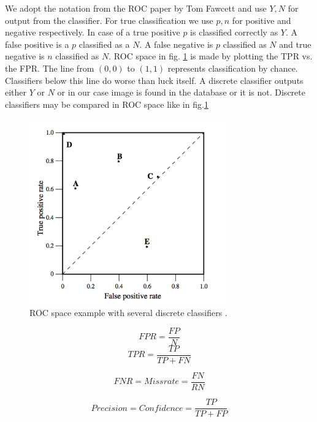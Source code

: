 \documentclass[english,12pt,a4paper,pdftex,elec,utf8, table]{aaltothesis}
\begin{document}
We adopt the notation from the ROC paper by Tom Fawcett and use ${Y,N}$ for output from the classifier. For true classification we use ${p,n}$ for positive and negative respectively. In case of a true positive $p$ is classified correctly as $Y$. A false positive is a $p$ classified as a $N$. A false negative is $p$ classified as $N$ and true negative is $n$ classified as $N$. ROC space in fig. \ref{figrocspace} is made by plotting the TPR vs. the FPR. The line from $(0,0)$ to $(1,1)$ represents classification by chance. Classifiers below this line do worse than luck itself. A discrete classifier outputs either $Y$ or $N$ or in our case image is found in the database or it is not. Discrete classifiers may be compared in ROC space like in fig.\ref{figrocspace} \cite{Fawcett2006}

\begin{figure}[htb]
\begin{center}
\includegraphics[height=8cm]{figures/ROC}
\end{center}
\caption{ROC space example with several discrete classifiers \cite{Fawcett2006}. }
\label{figrocspace}
\end{figure}

\begin{equation}\label{FPR}
FPR = \frac{FP}{N}
\end{equation}
\begin{equation}\label{TPR}
TPR = \frac{TP}{TP + FN}
\end{equation}

\begin{equation}\label{FNR}
FNR = Miss rate = \frac{FN}{RN}
\end{equation}

\begin{equation}\label{precision}
Precision = Confidence = \frac{TP}{TP + FP}
\end{equation}
\end{document}
